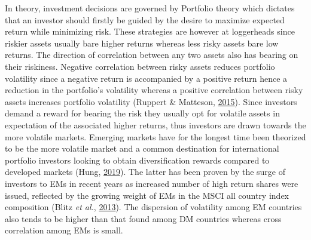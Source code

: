 \documentclass[11pt,preprint, authoryear]{elsarticle}
\numberwithin{equation}{section}
\numberwithin{figure}{section}
\numberwithin{table}{section}
\begin{document}
In theory, investment decisions are governed by Portfolio theory which
dictates that an investor should firstly be guided by the desire to
maximize expected return while minimizing risk. These strategies are
however at loggerheads since riskier assets usually bare higher returns
whereas less risky assets bare low returns. The direction of correlation
between any two assets also has bearing on their riskiness. Negative
correlation between risky assets reduces portfolio volatility since a
negative return is accompanied by a positive return hence a reduction in
the portfolio's volatility whereas a positive correlation between risky
assets increases portfolio volatility (Ruppert \& Matteson,
\protect\hyperlink{ref-ruppert2015}{2015}). Since investors demand a
reward for bearing the risk they usually opt for volatile assets in
expectation of the associated higher returns, thus investors are drawn
towards the more volatile markets. Emerging markets have for the longest
time been theorized to be the more volatile market and a common
destination for international portfolio investors looking to obtain
diversification rewards compared to developed markets (Hung,
\protect\hyperlink{ref-hung2019}{2019}). The latter has been proven by
the surge of investors to EMs in recent years as increased number of
high return shares were issued, reflected by the growing weight of EMs
in the MSCI all country index composition (Blitz \emph{et al.},
\protect\hyperlink{ref-blitz2013}{2013}). The dispersion of volatility
among EM countries also tends to be higher than that found among DM
countries whereas cross correlation among EMs is small.
\end{document}
